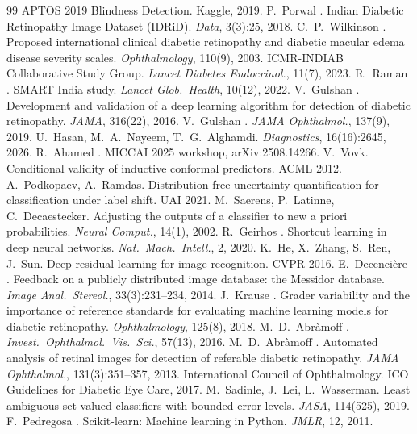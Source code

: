 \documentclass[10pt,twocolumn,letterpaper]{article}
\begin{document}
{\small
\begin{thebibliography}{99}\setlength{\itemsep}{0pt}
 APTOS 2019 Blindness Detection. Kaggle, 2019.
 P.~Porwal \etal. Indian Diabetic Retinopathy Image Dataset (IDRiD). \emph{Data}, 3(3):25, 2018.
 C.~P.~Wilkinson \etal. Proposed international clinical diabetic retinopathy and diabetic macular edema disease severity scales. \emph{Ophthalmology}, 110(9), 2003.
 ICMR-INDIAB Collaborative Study Group. \emph{Lancet Diabetes Endocrinol.}, 11(7), 2023.
 R.~Raman \etal. SMART India study. \emph{Lancet Glob.\ Health}, 10(12), 2022.
 V.~Gulshan \etal. Development and validation of a deep learning algorithm for detection of diabetic retinopathy. \emph{JAMA}, 316(22), 2016.
 V.~Gulshan \etal. \emph{JAMA Ophthalmol.}, 137(9), 2019.
 U.~Hasan, M.~A.~Nayeem, T.~G.~Alghamdi. \emph{Diagnostics}, 16(16):2645, 2026.
 R.~Ahamed \etal. MICCAI 2025 workshop, arXiv:2508.14266.
 V.~Vovk. Conditional validity of inductive conformal predictors. ACML 2012.
 A.~Podkopaev, A.~Ramdas. Distribution-free uncertainty quantification for classification under label shift. UAI 2021.
 M.~Saerens, P.~Latinne, C.~Decaestecker. Adjusting the outputs of a classifier to new a priori probabilities. \emph{Neural Comput.}, 14(1), 2002.
 R.~Geirhos \etal. Shortcut learning in deep neural networks. \emph{Nat.\ Mach.\ Intell.}, 2, 2020.
 K.~He, X.~Zhang, S.~Ren, J.~Sun. Deep residual learning for image recognition. CVPR 2016.
 E.~Decenci\`ere \etal. Feedback on a publicly distributed image database: the Messidor database. \emph{Image Anal.\ Stereol.}, 33(3):231--234, 2014.
 J.~Krause \etal. Grader variability and the importance of reference standards for evaluating machine learning models for diabetic retinopathy. \emph{Ophthalmology}, 125(8), 2018.
 M.~D.~Abr\`amoff \etal. \emph{Invest.\ Ophthalmol.\ Vis.\ Sci.}, 57(13), 2016.
 M.~D.~Abr\`amoff \etal. Automated analysis of retinal images for detection of referable diabetic retinopathy. \emph{JAMA Ophthalmol.}, 131(3):351--357, 2013.
 International Council of Ophthalmology. ICO Guidelines for Diabetic Eye Care, 2017.
 M.~Sadinle, J.~Lei, L.~Wasserman. Least ambiguous set-valued classifiers with bounded error levels. \emph{JASA}, 114(525), 2019.
 F.~Pedregosa \etal. Scikit-learn: Machine learning in Python. \emph{JMLR}, 12, 2011.

\end{thebibliography}}
\end{document}
